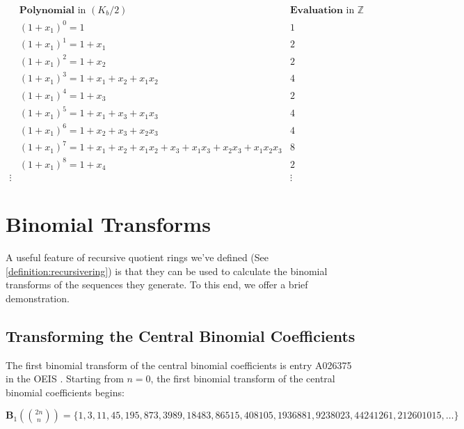 \documentclass{article}
\theoremstyle{plain}
\theoremstyle{definition}
\newcommand{\Z}{\mathbb{Z}}
\newcommand{\K}{K}
\newcommand{\BT}{\textbf{B}}
\begin{document}
\small
\begin{align*}
& \textbf{Polynomial} \text{ in } (\K_b/2) & \textbf{Evaluation} \text{ in } \Z \\ 
& (1+x_1)^0 = 1 & 1 \\
& (1+x_1)^1 = 1+x_1 & 2 \\
& (1+x_1)^2 = 1+x_2 & 2 \\
& (1+x_1)^3 = 1+x_1+x_2+x_1x_2 & 4 \\
& (1+x_1)^4 = 1+x_3 & 2 \\
& (1+x_1)^5 = 1+x_1+x_3+x_1x_3 & 4 \\
& (1+x_1)^6 = 1+x_2+x_3+x_2x_3 & 4 \\
& (1+x_1)^7 = 1+x_1+x_2+x_1x_2+x_3+x_1x_3+x_2x_3+x_1x_2x_3 & 8 \\
& (1+x_1)^8 = 1+x_4 & 2 \\
\vdots & & \vdots
\end{align*}
\normalsize

\section{Binomial Transforms}
A useful feature of recursive quotient rings we've defined (See \cref{definition:recursivering}) is that they can be used to calculate the binomial transforms of the sequences they generate. To this end, we offer a brief demonstration.

\subsection{Transforming the Central Binomial Coefficients}
The first binomial transform of the central binomial coefficients is entry A026375 in the OEIS \cite{A026375}. Starting from $n=0$, the first binomial transform of the central binomial coefficients begins:

$\BT_{1}(\binom{2n}{n}) = \{ 1, 3, 11, 45, 195, 873, 3989, 18483, 86515, 408105, 1936881, 9238023, 44241261, 212601015, \ldots \}$
\end{document}
